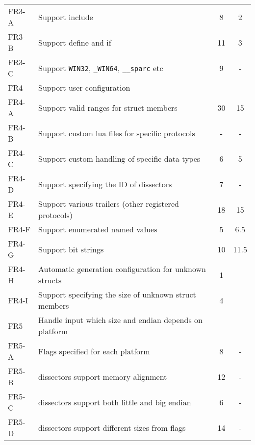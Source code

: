 \begin{table}[ht]
\begin{tabularx}{\textwidth}{l X c c}
	FR3-A & Support \gls{include} & 8 & 2 \\
	FR3-B & Support \gls{define} and \gls{if} & 11 & 3 \\
	FR3-C & Support \verb+WIN32+, \verb+_WIN64+, \verb+__sparc+ etc & 9 & - \\
	\addlinespace
	FR4 & Support user configuration & & \\
	FR4-A & Support valid ranges for \gls{struct} \glspl{member} & 30 & 15 \\
	FR4-B & Support custom \Gls{lua} files for specific protocols & - & - \\
	FR4-C & Support custom handling of specific data types & 6 & 5 \\
	FR4-D & Support specifying the ID of \glspl{dissector} & 7 & - \\
	FR4-E & Support various \gls{trailers} (other registered protocols) & 18 & 15 \\
	FR4-F & Support \glspl{enumerated named value}  & 5 & 6.5 \\
	FR4-G & Support bit strings & 10 & 11.5 \\
	FR4-H & Automatic generation configuration for unknown structs & 1 & \\
	FR4-I & Support specifying the size of unknown struct members & 4 & \\
	\addlinespace
	FR5 & Handle input which size and \gls{endian} depends on platform & & \\
	FR5-A & Flags specified for each platform & 8 & - \\
	FR5-B & \Glspl{dissector} support memory alignment & 12 & - \\
	FR5-C & \Glspl{dissector} support both little and big \gls{endian} & 6 & - \\
	FR5-D & \Glspl{dissector} support different sizes from flags & 14 & - \\	
    \bottomrule
\end{tabularx}
\end{table}	
	
